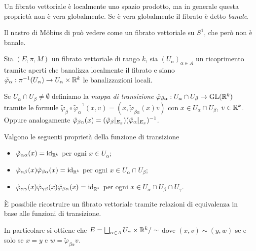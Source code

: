 \begin{remark}
	Un fibrato vettoriale è localmente uno spazio prodotto, ma in generale questa proprietà non è vera globalmente. Se è vera globalmente il fibrato è detto \emph{banale}.
\end{remark}

\begin{example} 
	Il nastro di M\"obius di può vedere come un fibrato vettoriale su $S^1$, che però non è banale.
\end{example}


Sia $(E,\pi, M)$ un fibrato vettoriale di rango $k$, sia $(U_\alpha)_{\alpha\in A}$ un ricoprimento tramite aperti che banalizza localmente il fibrato e siano $\tilde\varphi_\alpha:\pi^{-1}(U_\alpha)\to U_\alpha\times \mathbb R^k$ le banalizzazioni locali.

\begin{definition} 
	Se $U_\alpha\cap U_\beta\ne \emptyset$ definiamo la \emph{mappa di transizione} $\tilde\varphi_{\beta\alpha}:U_\alpha \cap U_\beta \to \mathrm{GL}(\mathbb R^k)$ tramite le formule $\tilde\varphi_\beta \circ \tilde\varphi_\alpha^{-1} (x,v) = (x, \tilde\varphi_{\beta\alpha}(x)v)$ con $x\in U_\alpha \cap U_\beta$, $v\in\mathbb R^k$. Oppure analogamente $\tilde\varphi_{\beta\alpha}(x) = (\tilde\varphi_\beta|_{E_x})(\tilde\varphi_\alpha|_{E_x})^{-1}$.
\end{definition}
	
\begin{proposition}
	Valgono le seguenti proprietà della funzione di transizione
	\begin{itemize}
	 \item $\tilde\varphi_{\alpha\alpha}(x)=\mathrm{id}_{\mathbb R^k}$ per ogni $x\in U_\alpha$;
	 \item $\tilde\varphi_{\alpha\beta}(x)\tilde\varphi_{\beta\alpha}(x) = \mathrm{id}_{\mathbb R^k}$ per ogni $x\in U_\alpha\cap U_\beta$;
	 \item $\tilde\varphi_{\alpha\gamma}(x) \tilde\varphi_{\gamma\beta}(x) \tilde\varphi_{\beta\alpha}(x) = \mathrm{id}_{\mathbb R^k}$ per ogni $x\in U_\alpha\cap U_\beta \cap U_\gamma$.
	\end{itemize}
\end{proposition}

\begin{remark}
	È possibile ricostruire un fibrato vettoriale tramite relazioni di equivalenza in base alle funzioni di transizione.
	
	In particolare si ottiene che $E = \bigsqcup_{\alpha\in A} U_\alpha \times \mathbb R^k / \sim$ dove $(x,v)\sim (y,w)$ se e solo se $x=y$ e $w = \tilde\varphi_{\beta\alpha}v$.
\end{remark}

